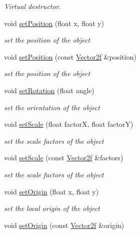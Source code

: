 \begin{DoxyCompactItemize}
\begin{DoxyCompactList}\small\item\em Virtual destructor. \end{DoxyCompactList}\item 
void \hyperlink{classsf_1_1_transformable_a4dbfb1a7c80688b0b4c477d706550208}{set\+Position} (float x, float y)
\begin{DoxyCompactList}\small\item\em set the position of the object \end{DoxyCompactList}\item 
void \hyperlink{classsf_1_1_transformable_af1a42209ce2b5d3f07b00f917bcd8015}{set\+Position} (const \hyperlink{classsf_1_1_vector2}{Vector2f} \&position)
\begin{DoxyCompactList}\small\item\em set the position of the object \end{DoxyCompactList}\item 
void \hyperlink{classsf_1_1_transformable_a32baf2bf1a74699b03bf8c95030a38ed}{set\+Rotation} (float angle)
\begin{DoxyCompactList}\small\item\em set the orientation of the object \end{DoxyCompactList}\item 
void \hyperlink{classsf_1_1_transformable_aaec50b46b3f41b054763304d1e727471}{set\+Scale} (float factor\+X, float factor\+Y)
\begin{DoxyCompactList}\small\item\em set the scale factors of the object \end{DoxyCompactList}\item 
void \hyperlink{classsf_1_1_transformable_a4c48a87f1626047e448f9c1a68ff167e}{set\+Scale} (const \hyperlink{classsf_1_1_vector2}{Vector2f} \&factors)
\begin{DoxyCompactList}\small\item\em set the scale factors of the object \end{DoxyCompactList}\item 
void \hyperlink{classsf_1_1_transformable_a56c67bd80aae8418d13fb96c034d25ec}{set\+Origin} (float x, float y)
\begin{DoxyCompactList}\small\item\em set the local origin of the object \end{DoxyCompactList}\item 
void \hyperlink{classsf_1_1_transformable_aa93a835ffbf3bee2098dfbbc695a7f05}{set\+Origin} (const \hyperlink{classsf_1_1_vector2}{Vector2f} \&origin)

\end{DoxyCompactItemize}
